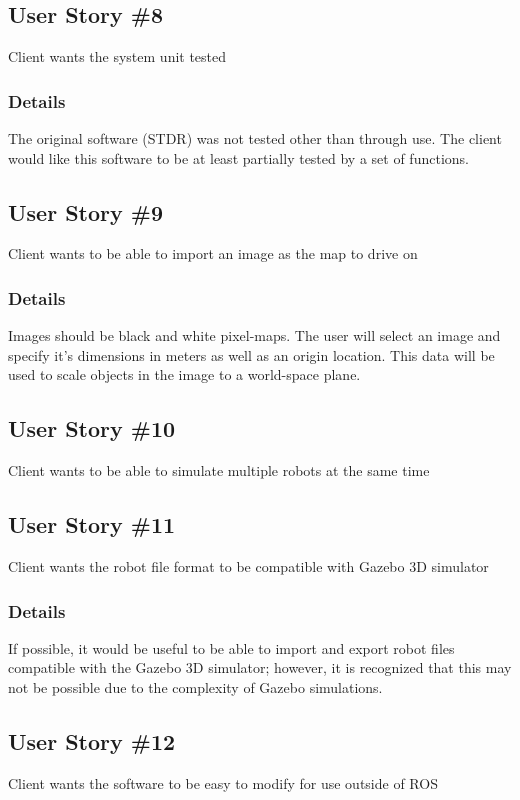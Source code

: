 \subsection{User Story \#8} 
Client wants the system unit tested

\subsubsection*{Details}
The original software (STDR) was not tested other than through use. The client would like this software to be at least partially tested by a set of functions.

\subsection{User Story \#9} 
Client wants to be able to import an image as the map to drive on

\subsubsection*{Details}
Images should be black and white pixel-maps. The user will select an image and specify it's dimensions in meters as well as an origin location. This data will be used to scale objects in the image to a world-space plane.

\subsection{User Story \#10} 
Client wants to be able to simulate multiple robots at the same time

\subsection{User Story \#11} 
Client wants the robot file format to be compatible with Gazebo 3D simulator

\subsubsection*{Details}
If possible, it would be useful to be able to import and export robot files compatible with the Gazebo 3D simulator; however, it is recognized that this may not be possible due to the complexity of Gazebo simulations.

\subsection{User Story \#12} 
Client wants the software to be easy to modify for use outside of ROS

